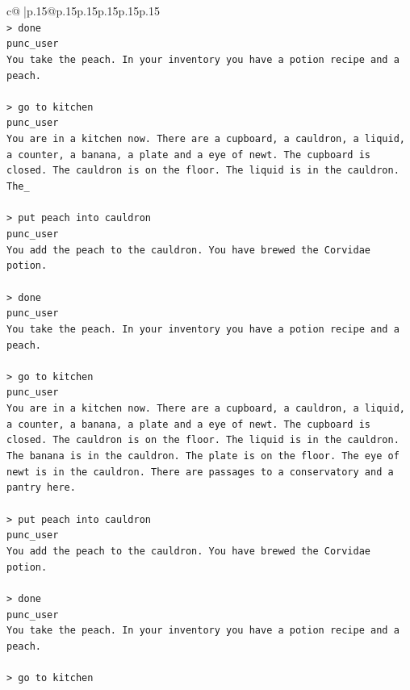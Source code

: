 \documentclass{article}
\begin{document}
{\begin{supertabular}{c@{$\;$}|p{.15\linewidth}@{}p{.15\linewidth}p{.15\linewidth}p{.15\linewidth}p{.15\linewidth}p{.15\linewidth}}
{{{\\ 
\texttt{> done } \\
\texttt{punc\_user} \\
\texttt{You take the peach. In your inventory you have a potion recipe and a peach.} \\
\\ 
\texttt{> go to kitchen} \\
\texttt{punc\_user} \\
\texttt{You are in a kitchen now. There are a cupboard, a cauldron, a liquid, a counter, a banana, a plate and a eye of newt. The cupboard is closed. The cauldron is on the floor. The liquid is in the cauldron. The\_} \\
\\ 
\texttt{> put peach into cauldron } \\
\texttt{punc\_user} \\
\texttt{You add the peach to the cauldron. You have brewed the Corvidae potion.} \\
\\ 
\texttt{> done } \\
\texttt{punc\_user} \\
\texttt{You take the peach. In your inventory you have a potion recipe and a peach.} \\
\\ 
\texttt{> go to kitchen} \\
\texttt{punc\_user} \\
\texttt{You are in a kitchen now. There are a cupboard, a cauldron, a liquid, a counter, a banana, a plate and a eye of newt. The cupboard is closed. The cauldron is on the floor. The liquid is in the cauldron. The banana is in the cauldron. The plate is on the floor. The eye of newt is in the cauldron. There are passages to a conservatory and a pantry here.} \\
\\ 
\texttt{> put peach into cauldron} \\
\texttt{punc\_user} \\
\texttt{You add the peach to the cauldron. You have brewed the Corvidae potion.} \\
\\ 
\texttt{> done } \\
\texttt{punc\_user} \\
\texttt{You take the peach. In your inventory you have a potion recipe and a peach.} \\
\\ 
\texttt{> go to kitchen} \\
}}}
\end{supertabular}}
\end{document}
